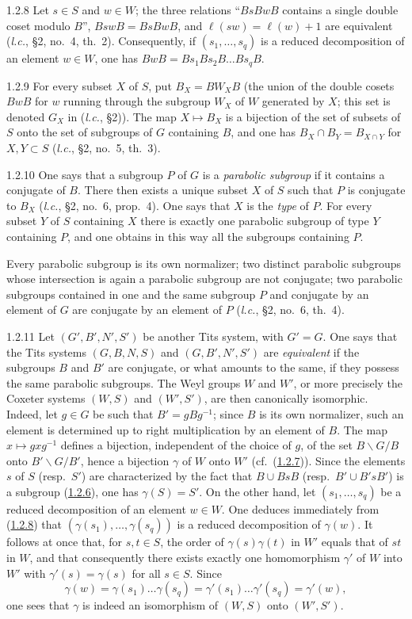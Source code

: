 \documentclass[12pt,a4paper,oneside,english]{smfart}
\makeatletter
\newcommand{\btanchor}[1]{\leavevmode\Hy@raisedlink{\hypertarget{bt:#1}{}}}
\newcommand{\btref}[1]{\hyperlink{bt:#1}{#1}}
\theoremstyle{definition}
\theoremstyle{bt}
\makeatother
\begin{document}
\num{1.2.8}\btanchor{1.2.8} Let $s\in S$ and $w\in W$; the three relations ``$BsBwB$ contains
a single double coset modulo $B$'', $BswB=BsBwB$, and $\ell(sw)=\ell(w)+1$ are equivalent (\emph{l.c.}, \S2, no.~4, th.~2). Consequently, if $(s_1,\dots,s_q)$ is a reduced decomposition of an element $w\in W$, one has $BwB=Bs_1Bs_2B\dots Bs_qB$.

\num{1.2.9}\btanchor{1.2.9} For every subset $X$ of $S$, put $B_X=BW_XB$ (the union of the
double cosets $BwB$ for $w$ running through the subgroup $W_X$ of $W$ generated by $X$; this set is denoted $G_X$ in (\emph{l.c.}, \S2)). The map $X\mapsto B_X$ is a bijection of the set of subsets of $S$ onto the set of subgroups of $G$ containing $B$, and one has $B_X\cap B_Y=B_{X\cap Y}$ for $X,Y\subset S$ (\emph{l.c.}, \S2, no.~5, th.~3).

\num{1.2.10}\btanchor{1.2.10} One says that a subgroup $P$ of $G$ is a \emph{parabolic
subgroup} if it contains a conjugate of $B$. There then exists a unique subset $X$ of $S$ such that $P$ is conjugate to $B_X$ (\emph{l.c.}, \S2, no.~6, prop.~4). One says that $X$ is the \emph{type} of $P$. For every subset $Y$ of $S$ containing $X$ there is exactly one parabolic subgroup of type $Y$ containing $P$, and one obtains in this way all the subgroups containing $P$.

Every parabolic subgroup is its own normalizer; two distinct parabolic subgroups whose intersection is again a parabolic subgroup are not conjugate; two parabolic subgroups contained in one and the same subgroup $P$ and conjugate by an element of $G$ are conjugate by an element of $P$ (\emph{l.c.}, \S2, no.~6, th.~4).

\num{1.2.11}\btanchor{1.2.11} Let $(G',B',N',S')$ be another Tits system, with $G'=G$. One says
that the Tits systems $(G,B,N,S)$ and $(G,B',N',S')$ are \emph{equivalent} if the subgroups $B$ and $B'$ are conjugate, or what amounts to the same, if they possess the same parabolic subgroups. The Weyl groups $W$ and $W'$, or more precisely the Coxeter systems $(W,S)$ and $(W',S')$, are then canonically isomorphic. Indeed, let $g\in G$ be such that $B'=gBg^{-1}$; since $B$ is its own normalizer, such an element is determined up to right multiplication by an element of $B$. The map $x\mapsto gxg^{-1}$ defines a bijection, independent of the choice of $g$, of the set $B\backslash G/B$ onto $B'\backslash G/B'$, hence a bijection $\gamma$ of $W$ onto $W'$ (cf.~(\btref{1.2.7})). Since the elements $s$ of $S$ (resp.\ $S'$) are characterized by the fact that $B\cup BsB$ (resp.\ $B'\cup B'sB'$) is a subgroup (\btref{1.2.6}), one has $\gamma(S)=S'$. On the other hand, let $(s_1,\dots,s_q)$ be a reduced decomposition of an element $w\in W$. One deduces immediately from (\btref{1.2.8}) that $(\gamma(s_1),\dots,\gamma(s_q))$ is a reduced decomposition of $\gamma(w)$. It follows at once that, for $s,t\in S$, the order of $\gamma(s)\gamma(t)$ in $W'$ equals that of $st$ in $W$, and that consequently there exists exactly one homomorphism $\gamma'$ of $W$ into $W'$ with $\gamma'(s)=\gamma(s)$ for all $s\in S$. Since
\[
  \gamma(w)=\gamma(s_1)\dots\gamma(s_q)
          =\gamma'(s_1)\dots\gamma'(s_q)=\gamma'(w),
\]
one sees that $\gamma$ is indeed an isomorphism of $(W,S)$ onto $(W',S')$.
\end{document}
